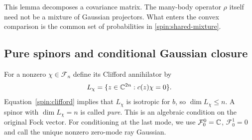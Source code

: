 This lemma decomposes a covariance matrix.  The many-body operator
$\rho$ itself need not be a mixture of Gaussian projectors.  What enters
the convex comparison is the common set of probabilities in
\eqref{spin:shared-mixture}.

\subsection{Pure spinors and conditional Gaussian closure}

For a nonzero $\chi\in\mathcal F_n$ define its Clifford annihilator by
\begin{equation}
 L_\chi=\{z\in\mathbb C^{2n}:c(z)\chi=0\}.
 \label{spin:annihilator}
\end{equation}
Equation~\eqref{spin:clifford} implies that $L_\chi$ is isotropic for
$b$, so $\dim L_\chi\le n$.  A spinor with $\dim L_\chi=n$ is called
\emph{pure}.  This is an algebraic condition on the original Fock vector.
For conditioning at the last mode, we use
$\mathcal F_0^0=\mathbb C$, $\mathcal F_0^1=0$ and call the unique nonzero
zero-mode ray Gaussian.

